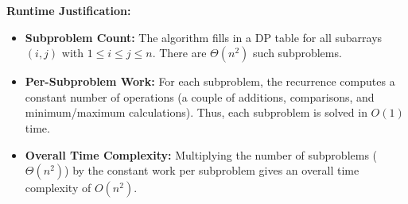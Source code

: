 \documentclass[11pt]{article}
\begin{document}
        \textbf{Runtime Justification:}
        \begin{itemize}
            \item \textbf{Subproblem Count:}  
            The algorithm fills in a DP table for all subarrays \((i,j)\) with \(1 \leq i \leq j \leq n\). There are \(\Theta(n^2)\) such subproblems.
            \item \textbf{Per-Subproblem Work:}  
            For each subproblem, the recurrence computes a constant number of operations (a couple of additions, comparisons, and minimum/maximum calculations). Thus, each subproblem is solved in \(O(1)\) time.
            \item \textbf{Overall Time Complexity:}  
            Multiplying the number of subproblems (\(\Theta(n^2)\)) by the constant work per subproblem gives an overall time complexity of \(O(n^2)\).
        \end{itemize}

    \newpage

    
    
\end{document}
